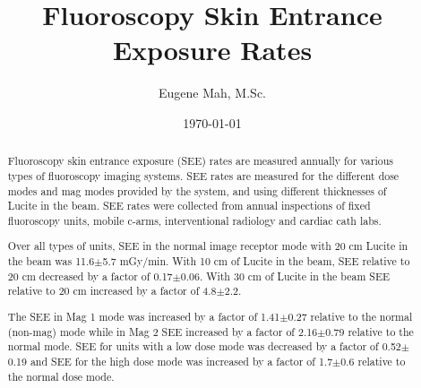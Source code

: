 \documentclass[aps,showpacs,showkeys,preprint,amsmath,amssymb]{revtex4}
\begin{document}

\title{Fluoroscopy Skin Entrance Exposure Rates}


\author{Eugene Mah, M.Sc.}


\date{\today}

\begin{abstract}
Fluoroscopy skin entrance exposure (SEE) rates are measured annually for various types of fluoroscopy imaging systems. SEE rates are measured for the different dose modes and mag modes provided by the system, and using different thicknesses of Lucite in the beam. SEE rates were collected from annual inspections of fixed fluoroscopy units, mobile c-arms, interventional radiology and cardiac cath labs.

Over all types of units, SEE in the normal image receptor mode with 20 cm Lucite in the beam was 11.6{$\pm$}5.7 mGy/min. With 10 cm of Lucite in the beam, SEE relative to 20 cm decreased by a factor of 0.17{$\pm$}0.06. With 30 cm of Lucite in the beam SEE relative to 20 cm increased by a factor of 4.8{$\pm$}2.2.

The SEE in Mag 1 mode was increased by a factor of 1.41{$\pm$}0.27 relative to the normal (non-mag) mode while in Mag 2 SEE increased by a factor of 2.16{$\pm$}0.79 relative to the normal mode. SEE for units with a low dose mode was decreased by a factor of 0.52{$\pm$}0.19 and SEE for the high dose mode was increased by a factor of 1.7{$\pm$}0.6 relative to the normal dose mode.


\end{abstract}
\end{document}
